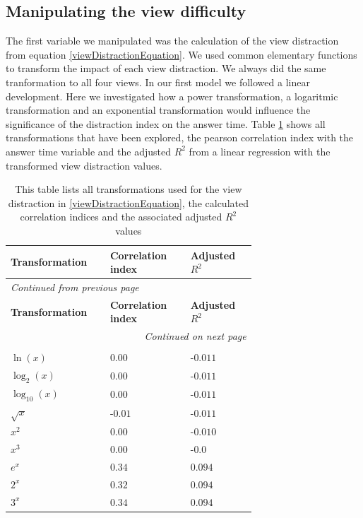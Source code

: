 \subsection{Manipulating the view difficulty}
The first variable we manipulated was the calculation of the view distraction from equation \ref{viewDistractionEquation}. We used common
elementary functions to transform the impact of each view distraction. We always did the same tranformation to all four views. In our first model we followed a
linear development. Here we investigated how a power transformation, a logaritmic transformation and an exponential transformation would influence
the significance of the distraction index on the answer time. Table \ref{viewDistractionTransformations} shows all transformations that have
been explored, the pearson correlation index with the answer time variable and the adjusted $R^2$ from a linear regression with the transformed
view distraction values.

\begin{longtable}{| p{0.24\linewidth} | p{0.25\linewidth} | p{0.20\linewidth}|}
    \hline
    \textbf{Transformation} & \textbf{Correlation index} & \textbf{Adjusted $R^2$} \\
    \hline
    \endfirsthead
    \multicolumn{3}{l}{{\textit{Continued from previous page}}} \\
    \hline
    \textbf{Transformation} & \textbf{Correlation index} & \textbf{Adjusted $R^2$} \\
    \hline
    \endhead
    \hline \multicolumn{3}{r}{{\textit{Continued on next page}}} \\
    \endfoot
    \hline
    \caption{This table lists all transformations used for the view distraction in \ref{viewDistractionEquation}, the calculated correlation indices and the associated adjusted $R^2$ values \label{viewDistractionTransformations}}\\
    \endlastfoot
    $ \ln(x) $ & $0.00$ & -$0.011$ \\
    \hline
    $ \log_{2}(x) $ & $0.00$ & -$0.011$ \\
    \hline
    $ \log_{10}(x) $ & $0.00$ & -$0.011$ \\
    \hline
    $ \sqrt{x} $ & -$0.01$ & -$0.011$ \\
    \hline
    $ x^2 $ & $0.00$ & -$0.010$ \\
    \hline
    $ x^3 $ & $0.00$ & -$0.0$ \\
    \hline
    $ e^x $ & $0.34$ & $0.094$ \\
    \hline
    $ 2^x $ & $0.32$ & $0.094$ \\
    \hline
    $ 3^x $ & $0.34$ & $0.094$ \\
\end{longtable}

